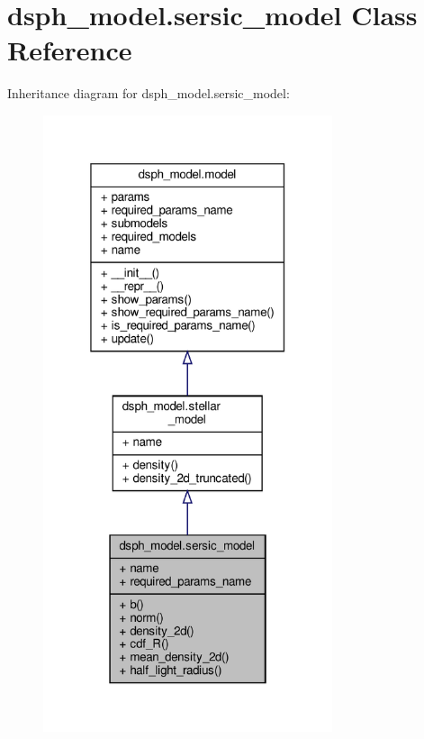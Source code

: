 \hypertarget{classdsph__model_1_1sersic__model}{}\section{dsph\+\_\+model.\+sersic\+\_\+model Class Reference}
\label{classdsph__model_1_1sersic__model}


Inheritance diagram for dsph\+\_\+model.\+sersic\+\_\+model\+:\nopagebreak
\begin{figure}[H]
\begin{center}
\leavevmode
\includegraphics[width=241pt]{dd/dec/classdsph__model_1_1sersic__model__inherit__graph}
\end{center}
\end{figure}


